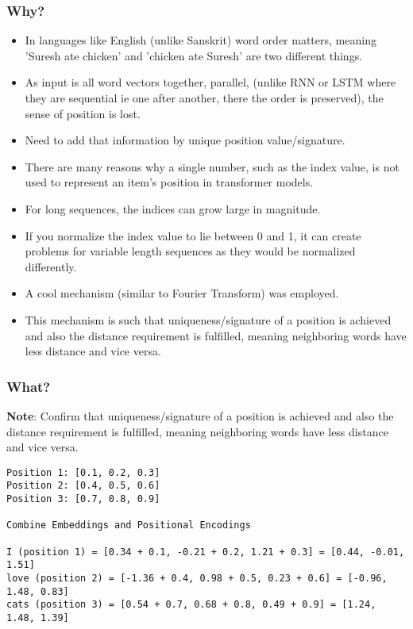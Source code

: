 \begin{frame}[fragile]\frametitle{Why?}


\begin{itemize}
\item In languages like English (unlike Sanskrit) word order matters, meaning 'Suresh ate chicken' and 'chicken ate Suresh' are two different things.
\item As input is all word vectors together, parallel, (unlike RNN or LSTM where they are sequential ie one after another, there the order is preserved), the sense of position is lost.
\item Need to add that information by unique position value/signature.
\item There are many reasons why a single number, such as the index value, is not used to represent an item’s position in transformer models. 
\item For long sequences, the indices can grow large in magnitude. 
\item If you normalize the index value to lie between 0 and 1, it can create problems for variable length sequences as they would be normalized differently.
\item A cool mechanism (similar to Fourier Transform) was employed.
\item This mechanism is such that uniqueness/signature of a position is achieved and also the distance requirement is fulfilled, meaning neighboring words have less distance and vice versa.
\end{itemize}

\end{frame}

\begin{frame}[fragile]\frametitle{What?}

{\bf Note}: Confirm that uniqueness/signature of a position is achieved and also the distance requirement is fulfilled, meaning neighboring words have less distance and vice versa.



\begin{lstlisting}
Position 1: [0.1, 0.2, 0.3]
Position 2: [0.4, 0.5, 0.6]
Position 3: [0.7, 0.8, 0.9]

Combine Embeddings and Positional Encodings

I (position 1) = [0.34 + 0.1, -0.21 + 0.2, 1.21 + 0.3] = [0.44, -0.01, 1.51]
love (position 2) = [-1.36 + 0.4, 0.98 + 0.5, 0.23 + 0.6] = [-0.96, 1.48, 0.83]
cats (position 3) = [0.54 + 0.7, 0.68 + 0.8, 0.49 + 0.9] = [1.24, 1.48, 1.39]
\end{lstlisting}


\end{frame}



